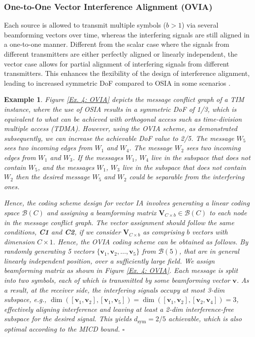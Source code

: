 \documentclass[a4paper,journal]{IEEEtran}
\def\v {\mathbf{v}}
\newtheorem{exe}{Example}
\begin{document}
\subsubsection{One-to-One Vector Interference Alignment (OVIA)}
Each source is allowed to transmit multiple symbols ($b>1$) via several beamforming vectors over time, whereas the interfering signals are still aligned in a one-to-one manner. 
Different from the scalar case where the signals from different transmitters are either perfectly aligned or linearly independent, the vector case allows for partial alignment of interfering signals from different transmitters.
% 
This enhances the flexibility of the design of interference alignment, leading to increased symmetric DoF compared to OSIA in some scenarios \cite{roth2006introduction}. 

\begin{exe}\label{Ex_OVIA}
Figure \ref{Ex. 4: OVIA} depicts the message conflict graph of a TIM instance, where the use of OSIA results in a symmetric DoF of 1/3, which is equivalent to what can be achieved with orthogonal access such as time-division multiple access (TDMA). However, using the OVIA scheme, as demonstrated subsequently, we can increase the achievable DoF value to 2/5.
% 
The message $W_{5}$ sees two incoming edges from $W_{1}$ and $W_{4}$. The message $W_{2}$ sees two incoming edges from $W_{1}$ and $W_{3}$. If the messages $W_{1}$, $W_{4}$ live in the subspace that does not contain $W_{5}$, and the messages $W_{1}$, $W_{3}$ live in the subspace that does not contain $W_{2}$ then the desired message $W_{5}$ and $W_{2}$ could be separable from the interfering ones.



Hence, the coding scheme design for vector IA involves generating a linear coding space $\mathcal{B}(C)$ and assigning a beamforming matrix $\mathbf{V}_{C\times b} \in \mathcal{B}(C)$ to each node in the message conflict graph. The vector assignment should follow the same conditions, \textbf{C1} and \textbf{C2}, if we consider $\mathbf{V}_{C\times b}$ as comprising $b$ vectors with dimension $C\times 1$.
Hence, the OVIA coding scheme can be obtained as follows.
By randomly generating 5 vectors $\{\v_1,\v_2,\dots,\v_5\}$ from $\mathcal{B}(5)$, that are in general linearly independent position, over a sufficiently large field. We assign beamforming matrix as shown in Figure \ref{Ex. 4: OVIA}.
Each message is split into two symbols, each of which is transmitted by some beamforming vector $\v$.
As a result, at the receiver side, the interfering signals occupy at most 3-dim subspace, e.g., 
$\dim([\v_1,\v_2],[\v_1,\v_5])=\dim([\v_1,\v_2],[\v_2,\v_4])=3$,
effectively aligning interference
and leaving at least a 2-dim interference-free subspace for the desired signal. This yields $d_{\mathrm{sym}}=2/5$ achievable, which is also optimal according to the MICD bound.    \hfill $\square$
\end{exe}
\end{document}
